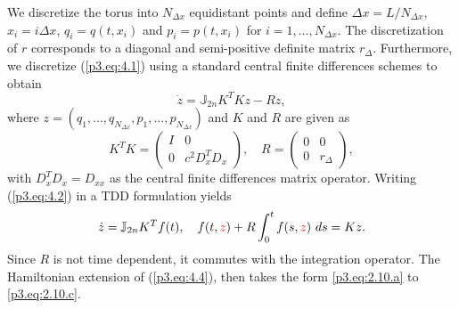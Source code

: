 We discretize the torus into $N_{\Delta x}$ equidistant points and define $\Delta x = L/N_{\Delta x}$, $x_i = i\Delta x$, $q_i=q(t,x_i)$ and $p_i=p(t,x_i)$ for $i = 1, \dots, N_{\Delta x}$. The discretization of $r$ corresponds to a diagonal and semi-positive definite matrix $r_\Delta$. Furthermore, we discretize (\ref{p3.eq:4.1}) using a standard central finite differences schemes to obtain
\begin{equation} \label{p3.eq:4.2}
	\dot z = \mathbb J_{2n} K^T K z - R z,
\end{equation}
where $z = (q_1,\dots,q_{N_{\Delta x}},p_1,\dots,p_{N_{\Delta x}})$ and $K$ and $R$ are given as
\begin{equation} \label{p3.eq:4.3}
	K^T K =
	\begin{pmatrix}
		I & 0 \\
		0 & c^2D_x^TD_x
	\end{pmatrix} , \quad
	R =
	\begin{pmatrix}
		0 & 0 \\
		0 & r_\Delta
	\end{pmatrix},
\end{equation}
with $D_x^TD_x = D_{xx}$ as the central finite differences matrix operator. Writing (\ref{p3.eq:4.2}) in a TDD formulation yields
\begin{equation} \label{p3.eq:4.4}
	\dot z = \mathbb J_{2n} K^T f(t), \quad f(t,{\color{red} z}) + R \int_0^t f(s,{\color{red} z}) \ ds = K z.
\end{equation}
Since $R$ is not time dependent, it commutes with the integration operator. The Hamiltonian extension of (\ref{p3.eq:4.4}), then takes the form \eqref{p3.eq:2.10.a} to \eqref{p3.eq:2.10.c}.

